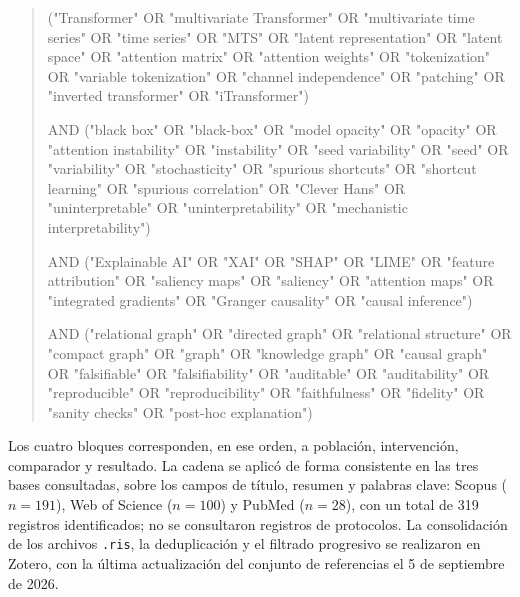 \begingroup
\footnotesize\ttfamily\sloppy
\begin{quote}
\noindent
("Transformer" OR "multivariate Transformer" OR "multivariate time series" OR "time series" OR "MTS" OR "latent representation" OR "latent space" OR "attention matrix" OR "attention weights" OR "tokenization" OR "variable tokenization" OR "channel independence" OR "patching" OR "inverted transformer" OR "iTransformer")

\medskip
\noindent AND ("black box" OR "black-box" OR "model opacity" OR "opacity" OR "attention instability" OR "instability" OR "seed variability" OR "seed" OR "variability" OR "stochasticity" OR "spurious shortcuts" OR "shortcut learning" OR "spurious correlation" OR "Clever Hans" OR "uninterpretable" OR "uninterpretability" OR "mechanistic interpretability")

\medskip
\noindent AND ("Explainable AI" OR "XAI" OR "SHAP" OR "LIME" OR "feature attribution" OR "saliency maps" OR "saliency" OR "attention maps" OR "integrated gradients" OR "Granger causality" OR "causal inference")

\medskip
\noindent AND ("relational graph" OR "directed graph" OR "relational structure" OR "compact graph" OR "graph" OR "knowledge graph" OR "causal graph" OR "falsifiable" OR "falsifiability" OR "auditable" OR "auditability" OR "reproducible" OR "reproducibility" OR "faithfulness" OR "fidelity" OR "sanity checks" OR "post-hoc explanation")
\end{quote}
\endgroup

Los cuatro bloques corresponden, en ese orden, a población, intervención, comparador y resultado. La cadena se aplicó de forma consistente en las tres bases consultadas, sobre los campos de título, resumen y palabras clave: Scopus ($n=191$), Web of Science ($n=100$) y PubMed ($n=28$), con un total de 319 registros identificados; no se consultaron registros de protocolos. La consolidación de los archivos \texttt{.ris}, la deduplicación y el filtrado progresivo se realizaron en Zotero, con la última actualización del conjunto de referencias el 5 de septiembre de 2026.


